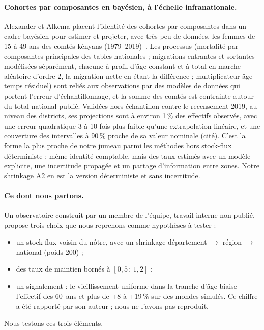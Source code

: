 \documentclass[11pt]{article}
\begin{document}
\paragraph{Cohortes par composantes en bayésien, à l'échelle infranationale.} Alexander et Alkema
placent l'identité des cohortes par composantes dans un cadre bayésien pour estimer et projeter,
avec très peu de données, les femmes de 15 à 49 ans des comtés kényans
(1979--2019)~\cite{alexander2021bayesian}. Les processus (mortalité par composantes principales des
tables nationales ; migrations entrantes et sortantes modélisées séparément, chacune à profil d'âge
constant et à total en marche aléatoire d'ordre 2, la migration nette en étant la différence ;
multiplicateur âge-temps résiduel) sont reliés aux observations par
des modèles de données qui portent l'erreur d'échantillonnage, et la somme des comtés est contrainte
autour du total national publié. Validées hors échantillon contre le recensement 2019, au niveau
des districts, ses projections sont à environ 1\,\% des effectifs observés, avec une erreur quadratique 3 à 10 fois
plus faible qu'une extrapolation linéaire, et une couverture des intervalles à 90\,\% proche de sa
valeur nominale (cité). C'est la forme la plus proche de notre jumeau parmi les méthodes hors
stock-flux déterministe : même identité comptable, mais des taux estimés avec un modèle explicite,
une incertitude propagée et un partage d'information entre zones. Notre shrinkage A2 en est la
version déterministe et sans incertitude.

\paragraph{Ce dont nous partons.} Un observatoire construit par un membre de
l'équipe, travail interne non publié, propose trois choix que nous reprenons comme hypothèses à
tester :
\begin{itemize}
\item un stock-flux voisin du nôtre, avec un shrinkage département $\to$ région $\to$ national
  (poids 200) ;
\item des taux de maintien bornés à $[0{,}5\,;\,1{,}2]$ ;
\item un signalement : le vieillissement uniforme dans la tranche d'âge biaise l'effectif des
  60~ans et plus de +8 à +19\,\% sur des mondes simulés. Ce chiffre a été rapporté par son
  auteur ; nous ne l'avons pas reproduit.
\end{itemize}
Nous testons ces trois éléments.
\end{document}
